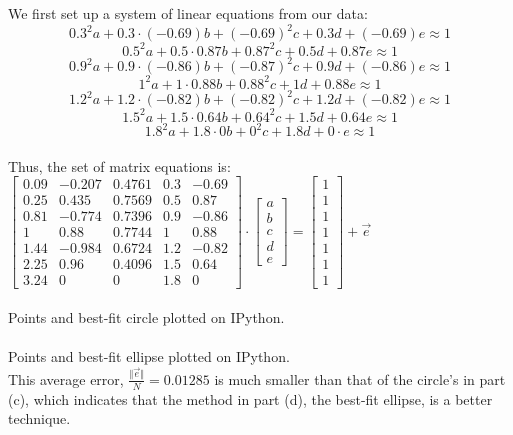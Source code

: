 \documentclass{article}
\begin{document}
We first set up a system of linear equations from our data:
$$0.3^2 a + 0.3\cdot(-0.69) b + (-0.69)^2 c + 0.3 d + (-0.69) e \approx 1$$
$$0.5^2 a + 0.5\cdot0.87 b + 0.87^2 c + 0.5 d + 0.87 e \approx 1$$
$$0.9^2 a + 0.9\cdot(-0.86) b + (-0.87)^2 c + 0.9 d + (-0.86) e \approx 1$$
$$1^2 a + 1\cdot0.88 b + 0.88^2 c + 1 d + 0.88 e \approx 1$$
$$1.2^2 a + 1.2\cdot(-0.82) b + (-0.82)^2 c + 1.2 d + (-0.82) e \approx 1$$
$$1.5^2 a + 1.5\cdot0.64 b + 0.64^2 c + 1.5 d + 0.64 e \approx 1$$
$$1.8^2 a + 1.8\cdot0 b + 0^2 c + 1.8 d + 0\cdot e \approx 1$$ \\

Thus, the set of matrix equations is: {\color{red}
$
\begin{bmatrix}
	0.09 & -0.207 & 0.4761 & 0.3 & -0.69 \\
	0.25 & 0.435  & 0.7569 & 0.5 & 0.87 \\
	0.81 & -0.774 & 0.7396 & 0.9 & -0.86 \\
	1    & 0.88   & 0.7744 & 1   & 0.88 \\
	1.44 & -0.984 & 0.6724 & 1.2 & -0.82 \\
	2.25 & 0.96   & 0.4096 & 1.5 & 0.64 \\
	3.24 & 0      & 0      & 1.8 & 0
\end{bmatrix} \cdot
\begin{bmatrix}
	a \\ b \\ c \\ d \\ e
\end{bmatrix} =
\begin{bmatrix}
	1 \\ 1 \\ 1 \\ 1 \\ 1 \\ 1 \\ 1
\end{bmatrix} + \vec{e}
$} \\[.5cm]

{\large {} } \\

Points and best-fit circle plotted on IPython. \\[.5cm]

{\large {} } \\

Points and best-fit ellipse plotted on IPython. \\

This average error, $\frac{\Vert\vec{e}\Vert}{N} = 0.01285$ is much smaller than that of the circle's in part (c), which indicates that the method in part (d), the best-fit ellipse, is a better technique.
\end{document}
